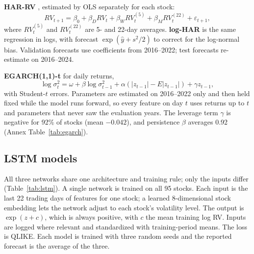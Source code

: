 \documentclass[11pt,a4paper]{article}
\begin{document}
\textbf{HAR-RV} \citep{corsi2009}, estimated by OLS separately for each stock:
\begin{equation}
RV_{t+1}=\beta_0+\beta_D RV_t+\beta_W RV^{(5)}_t+\beta_M RV^{(22)}_t+\varepsilon_{t+1},
\end{equation}
where $RV^{(5)}_t$ and $RV^{(22)}_t$ are 5- and 22-day averages. \textbf{log-HAR} is the same
regression in logs, with forecast $\exp(\hat y+s^2/2)$ to correct for the log-normal bias. Validation
forecasts use coefficients from 2016--2022; test forecasts re-estimate on 2016--2024.

\textbf{EGARCH(1,1)-t} \citep{nelson1991} for daily returns,
\begin{equation}
\log\sigma_t^2=\omega+\beta\log\sigma_{t-1}^2+\alpha\left(|z_{t-1}|-E|z_{t-1}|\right)+\gamma z_{t-1},
\end{equation}
with Student-$t$ errors. Parameters are estimated on 2016--2022 only and then held fixed while the
model runs forward, so every feature on day $t$ uses returns up to $t$ and parameters that never saw
the evaluation years. The leverage term $\gamma$ is negative for 92\% of stocks (mean $-0.042$),
and persistence $\beta$ averages 0.92 (Annex Table~\ref{tab:egarch}).

\subsection{LSTM models}

All three networks share one architecture and training rule; only the inputs differ
(Table~\ref{tab:lstm}). A single network is trained on all 95 stocks. Each input is the last 22
trading days of features for one stock; a learned 8-dimensional stock embedding lets the network
adjust to each stock's volatility level. The output is $\exp(z+c)$, which is always positive, with
$c$ the mean training log RV. Inputs are logged where relevant and standardized with training-period
means. The loss is QLIKE. Each model is trained with three random seeds and the reported forecast is
the average of the three.
\end{document}
